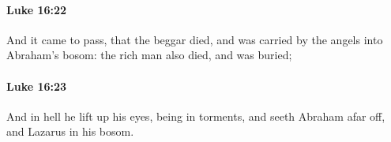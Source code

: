 		\paragraph{Luke 16:22} %
			\label{LUKE-16-22}

			And it came to pass, that the beggar died, and was carried by the angels into Abraham's bosom: the rich man also died, and was buried;

			\begin{framed}
			\scriptsize
				\begin{compactdesc}
					\item[SBLG] 
				\end{compactdesc}
			\end{framed}

		\paragraph{Luke 16:23} %
			\label{LUKE-16-23}

			And in hell he lift up his eyes, being in torments, and seeth Abraham afar off, and Lazarus in his bosom.

